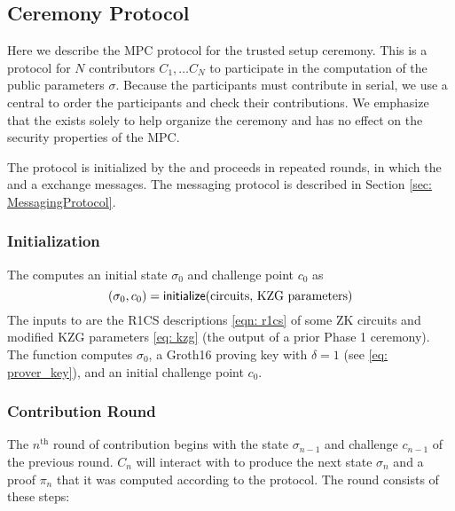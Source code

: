 \subsection{Ceremony Protocol}

Here we describe the MPC protocol for the trusted setup ceremony. This is a protocol for $N$ contributors $C_1, \ldots C_N$ to participate in the computation of the public parameters $\sigma$. Because the participants must contribute in serial, we use a central \Coordinator{} to order the participants and check their contributions. We emphasize that the \Coordinator{} exists solely to help organize the ceremony and has no effect on the security properties of the MPC.

The protocol is initialized by the \Coordinator{} and proceeds in repeated rounds, in which the \Coordinator{} and a \Contributor{} exchange messages. The messaging protocol is described in Section \ref{sec: MessagingProtocol}.

\subsubsection*{Initialization}

The \Coordinator{} computes an initial state $\sigma_0$ and challenge point $c_0$ as 
\begin{equation*}
    (\sigma_0, c_0) =  {\textsf{initialize}}{}(\text{circuits, KZG parameters})
\end{equation*} 
The inputs to \initialize{} are the R1CS descriptions \eqref{eqn: r1cs} of some ZK circuits and modified KZG parameters \eqref{eq: kzg} (the output of a prior Phase 1 ceremony). The function \initialize{} computes $\sigma_0$, a Groth16 proving key with $\delta = 1$ (see \eqref{eq: prover_key}), and an initial challenge point $c_0$.

\subsubsection*{Contribution Round}

The $n^{\text{th}}$ round of contribution begins with the state $\sigma_{n-1}$ and challenge $c_{n-1}$ of the previous round. \Contributor{} $C_n$ will interact with \Coordinator{} to produce the next state $\sigma_{n}$ and a proof $\pi_{n}$ that it was computed according to the protocol. The round consists of these steps:


